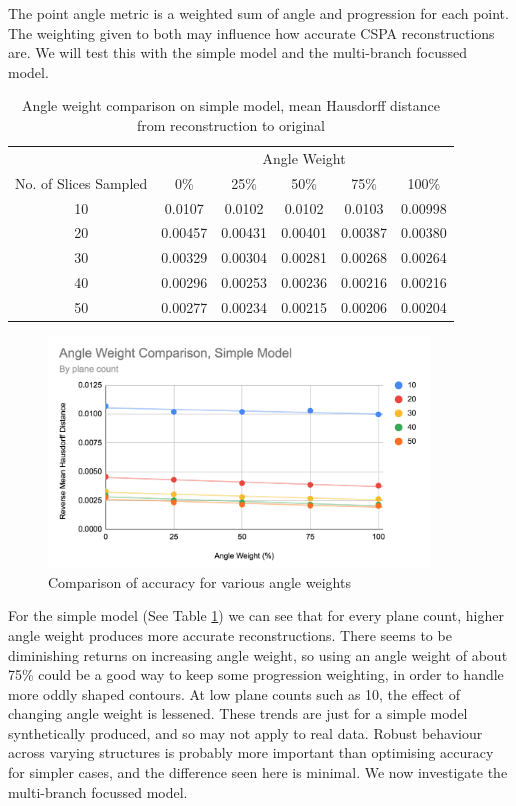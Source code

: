\documentclass[11p, titlepage]{article}
\begin{document}
The point angle metric is a weighted sum of angle and progression for each point. The weighting given to both may influence how accurate CSPA reconstructions are. We will test this with the simple model and the multi-branch focussed model.

\begin{table}[h!]
\begin{tabular}{ | c | c | c | c | c | c | }
\hline
& \multicolumn{5}{c|}{Angle Weight} \\
\cline{2-6}
No. of Slices Sampled & 0\% & 25\% & 50\% & 75\% & 100\% \\
\hline
10 & 0.0107 & 0.0102 & 0.0102 & 0.0103 & 0.00998 \\
20 & 0.00457 & 0.00431 & 0.00401 & 0.00387 & 0.00380 \\
30 & 0.00329 & 0.00304 & 0.00281 & 0.00268 & 0.00264 \\
40 & 0.00296 & 0.00253 & 0.00236 & 0.00216 & 0.00216 \\
50 & 0.00277 & 0.00234 & 0.00215 & 0.00206 & 0.00204 \\
\hline
\end{tabular}
\caption{Angle weight comparison on simple model, mean Hausdorff distance from reconstruction to original}
\label{table:ang_weight_simple_reverse_transpose}
\end{table}

\begin{figure}[h!]
\centering
\includegraphics[width=0.9\textwidth]{graphs/ang_weight_simple_reverse}
\caption{Comparison of accuracy for various angle weights\label{fig:ang_weight_simple_reverse}}
\end{figure}
\FloatBarrier

For the simple model (See Table \ref{table:ang_weight_simple_reverse_transpose}) we can see that for every plane count, higher angle weight produces more accurate reconstructions. There seems to be diminishing returns on increasing angle weight, so using an angle weight of about 75\% could be a good way to keep some progression weighting, in order to handle more oddly shaped contours. At low plane counts such as 10, the effect of changing angle weight is lessened. These trends are just for a simple model synthetically produced, and so may not apply to real data. Robust behaviour across varying structures is probably more important than optimising accuracy for simpler cases, and the difference seen here is minimal. We now investigate the multi-branch focussed model.
\end{document}
